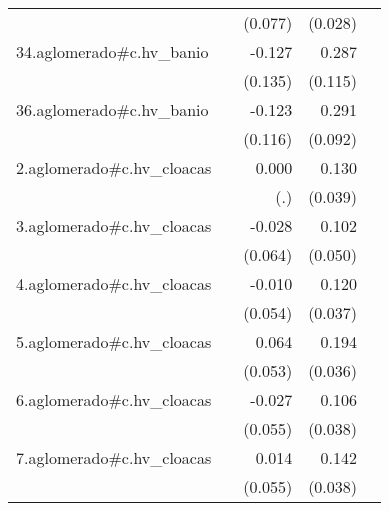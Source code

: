 {\begin{longtable}{l*{4}{D{.}{.}{-1}}}
            &                     &     (0.077)         &     (0.028)         &                     \\
\addlinespace
34.aglomerado#c.hv\_banio&                     &      -0.127         &       0.287\sym{*}  &                     \\
            &                     &     (0.135)         &     (0.115)         &                     \\
\addlinespace
36.aglomerado#c.hv\_banio&                     &      -0.123         &       0.291\sym{**} &                     \\
            &                     &     (0.116)         &     (0.092)         &                     \\
\addlinespace
2.aglomerado#c.hv\_cloacas&                     &       0.000         &       0.130\sym{**} &                     \\
            &                     &         (.)         &     (0.039)         &                     \\
\addlinespace
3.aglomerado#c.hv\_cloacas&                     &      -0.028         &       0.102\sym{*}  &                     \\
            &                     &     (0.064)         &     (0.050)         &                     \\
\addlinespace
4.aglomerado#c.hv\_cloacas&                     &      -0.010         &       0.120\sym{**} &                     \\
            &                     &     (0.054)         &     (0.037)         &                     \\
\addlinespace
5.aglomerado#c.hv\_cloacas&                     &       0.064         &       0.194\sym{***}&                     \\
            &                     &     (0.053)         &     (0.036)         &                     \\
\addlinespace
6.aglomerado#c.hv\_cloacas&                     &      -0.027         &       0.106\sym{**} &                     \\
            &                     &     (0.055)         &     (0.038)         &                     \\
\addlinespace
7.aglomerado#c.hv\_cloacas&                     &       0.014         &       0.142\sym{***}&                     \\
            &                     &     (0.055)         &     (0.038)         &                     \\

\end{longtable}}
